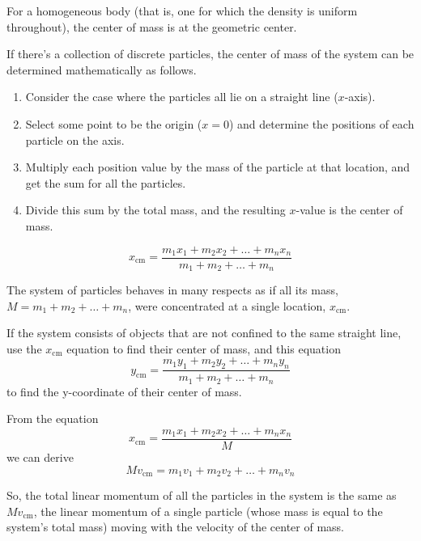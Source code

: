 \documentclass{article}
\begin{document}
For a homogeneous body (that is, one for which the density is uniform throughout), the center of mass is at the geometric center.

If there's a collection of discrete particles, the center of mass of the system can be determined mathematically as follows.
\begin{enumerate}
    \item Consider the case where the particles all lie on a straight line ($x$-axis).
    \item Select some point to be the origin ($x = 0$) and determine the positions of each particle on the axis.
    \item Multiply each position value by the mass of the particle at that location, and get the sum for all the particles.
    \item Divide this sum by the total mass, and the resulting $x$-value is the center of mass.
\end{enumerate} 
\begin{equation*}
    x_{\text{cm}} = \frac{m_{1}x_{1}+m_{2}x_{2}+\dots+m_{n}x_{n}}{m_{1}+m_{2}+\dots+m_{n}}
\end{equation*}

The system of particles behaves in many respects as if all its mass, $M = m_{1} + m_{2} + \dots + m_{n}$, were concentrated at a single location, $x_{\text{cm}}$.

If the system consists of objects that are not confined to the same straight line, use the $x_{\text{cm}}$ equation to find their center of mass, and this equation
\begin{equation*}
    y_{\text{cm}} = \frac{m_{1}y_{1}+m_{2}y_{2}+\dots+m_{n}y_{n}}{m_{1}+m_{2}+\dots+m_{n}}
\end{equation*}
to find the y-coordinate of their center of mass.

From the equation
\begin{equation*}
    x_{\text{cm}} = \frac{m_{1}x_{1}+m_{2}x_{2}+\dots+m_{n}x_{n}}{M}
\end{equation*}
we can derive
\begin{equation*}
    Mv_{\text{cm}} = m_{1}v_{1}+m_{2}v_{2}+\dots+m_{n}v_{n}
\end{equation*}

So, the total linear momentum of all the particles in the system is the same as $Mv_{\text{cm}}$, the linear momentum of a single particle (whose mass is equal to the system's total mass) moving with the velocity of the center of mass.
\end{document}
